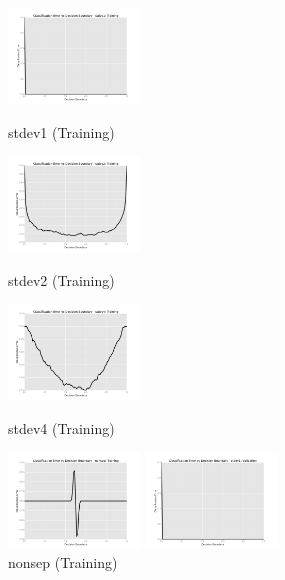 \documentclass[10pt]{article}
\begin{document}
\begin{figure}[ht]
	\centering
	\begin{minipage}[b]{.24\linewidth}
		\includegraphics[width=1\linewidth, height=1in]{CEDB_stdev1_train.png}
		\caption*{stdev1 (Training)}
	\end{minipage}
	\begin{minipage}[b]{.24\linewidth}
		\includegraphics[width=1\linewidth, height=1in]{CEDB_stdev2_train.png}
		\caption*{stdev2 (Training)}
	\end{minipage}
	\begin{minipage}[b]{.24\linewidth}
		\includegraphics[width=1\linewidth, height=1in]{CEDB_stdev4_train.png}
		\caption*{stdev4 (Training)}
	\end{minipage}
	\begin{minipage}[b]{.24\linewidth}
		\includegraphics[width=1\linewidth, height=1in]{CEDB_nonsep_train.png}
		\caption*{nonsep (Training)}
	\end{minipage}
		\begin{minipage}[b]{.24\linewidth}
		\includegraphics[width=1\linewidth, height=1in]{CEDB_stdev1_validation.png}

\end{minipage}
\end{figure}
\end{document}
